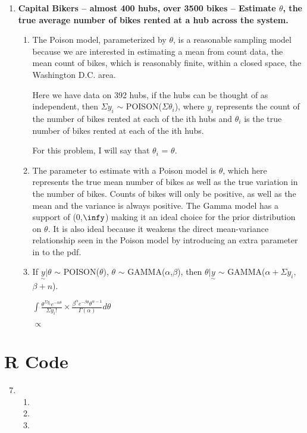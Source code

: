 \documentclass{article}\usepackage[]{graphicx}\usepackage[]{color}
\begin{document}
\begin{enumerate}
\addtocounter{enumi}{1}
\item%
{\bf Capital Bikers -- almost 400 hubs, over 3500 bikes -- Estimate $\theta$, the true average number of bikes rented at a hub across the system.}


\begin{enumerate}
\item%

The Poison model, parameterized by $\theta$, is a reasonable sampling model because we are interested in estimating a mean from count data, the mean count of bikes, which is reasonably finite, within a closed space, the Washington D.C. area.

Here we have data on 392 hubs, if the hubs can be thought of as independent, then $\Sigma y_{i}$ $\sim$ POISON($\Sigma \theta_{i}$), where $y_{i}$ represents the count of the number of bikes rented at each of the ith hubs and $\theta_{i}$ is the true number of bikes rented at each of the ith hubs.

For this problem, I will say that $\theta_{i}$ = $\theta$.

\item%
The parameter to estimate with a Poison model is $\theta$, which here represents the true mean number of bikes as well as the true variation in the number of bikes. Counts of bikes will only be positive, as well as the mean and the variance is always positive. The Gamma model has a support of (0,$\infy$) making it an ideal choice for the prior distribution on $\theta$. It is also ideal because it weakens the direct mean-variance relationship seen in the Poison model by introducing an extra parameter in to the pdf.

\item%
If $\underset{\sim}{y} | \theta$ $\sim$ POISON($\theta$), $\theta$ $\sim$ GAMMA($\alpha$,$\beta$), then $\theta | \underset{\sim}{y}$ $\sim$ GAMMA($\alpha + \Sigma y_{i}$, $\beta + n$).

$\int \frac{\theta^{\Sigma y_{i}}e^{-n\theta}}{\Sigma y_{i}!} \times \frac{\beta^{\alpha}e^{-\beta\theta}\theta^{\alpha - 1}}{\Gamma(\alpha)} d\theta$

$\propto$



\end{enumerate}
\end{enumerate}

\appendix
\section*{R Code}

\begin{enumerate}

\setcounter{enumi}{6}
\item%
\begin{enumerate}
\item%

\addtocounter{enumii}{1}
\item %



\item %


\end{enumerate}
\end{enumerate}
\end{document}
